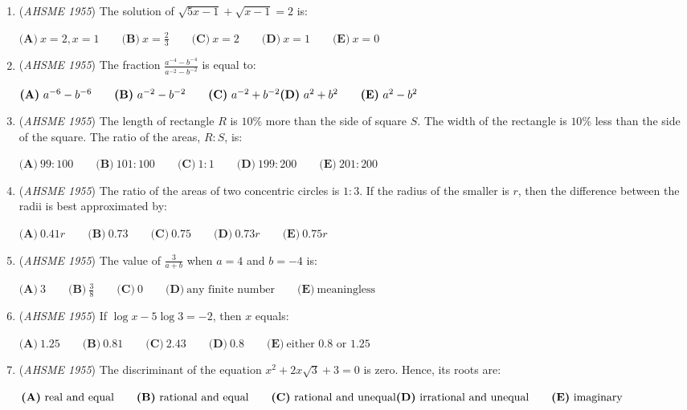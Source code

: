 \begin{enumerate}
	\item (\textit{AHSME 1955}) The solution of $\sqrt{5x-1}+\sqrt{x-1}=2$ is: 


 $\textbf{(A)}\ x=2,x=1\qquad\textbf{(B)}\ x=\frac{2}{3}\qquad\textbf{(C)}\ x=2\qquad\textbf{(D)}\ x=1\qquad\textbf{(E)}\ x=0$


	\item (\textit{AHSME 1955}) The fraction $\frac{a^{-4}-b^{-4}}{a^{-2}-b^{-2}}$ is equal to: 


 $\textbf{(A)}\ a^{-6}-b^{-6}\qquad\textbf{(B)}\ a^{-2}-b^{-2}\qquad\textbf{(C)}\ a^{-2}+b^{-2}\\ \textbf{(D)}\ a^2+b^2\qquad\textbf{(E)}\ a^2-b^2$


	\item (\textit{AHSME 1955}) The length of rectangle $R$ is $10$\% more than the side of square $S$. The width of the rectangle is $10$\% less than the side of the square. 
The ratio of the areas, $R:S$, is: 


 $\textbf{(A)}\ 99: 100\qquad\textbf{(B)}\ 101: 100\qquad\textbf{(C)}\ 1: 1\qquad\textbf{(D)}\ 199: 200\qquad\textbf{(E)}\ 201: 200$


	\item (\textit{AHSME 1955}) The ratio of the areas of two concentric circles is $1: 3$. If the radius of the smaller is $r$, then the difference between the 
radii is best approximated by: 


 $\textbf{(A)}\ 0.41r \qquad \textbf{(B)}\ 0.73 \qquad \textbf{(C)}\ 0.75 \qquad \textbf{(D)}\ 0.73r \qquad \textbf{(E)}\ 0.75r$


	\item (\textit{AHSME 1955}) The value of $\frac{3}{a+b}$ when $a=4$ and $b=-4$ is: 


 $\textbf{(A)}\ 3\qquad\textbf{(B)}\ \frac{3}{8}\qquad\textbf{(C)}\ 0\qquad\textbf{(D)}\ \text{any finite number}\qquad\textbf{(E)}\ \text{meaningless}$


	\item (\textit{AHSME 1955}) If $\log x-5 \log 3=-2$, then $x$ equals: 


 $\textbf{(A)}\ 1.25\qquad\textbf{(B)}\ 0.81\qquad\textbf{(C)}\ 2.43\qquad\textbf{(D)}\ 0.8\qquad\textbf{(E)}\ \text{either 0.8 or 1.25}$


	\item (\textit{AHSME 1955}) The discriminant of the equation $x^2+2x\sqrt{3}+3=0$ is zero. Hence, its roots are: 


 $\textbf{(A)}\ \text{real and equal}\qquad\textbf{(B)}\ \text{rational and equal}\qquad\textbf{(C)}\ \text{rational and unequal}\\ \textbf{(D)}\ \text{irrational and unequal}\qquad\textbf{(E)}\ \text{imaginary}$



\end{enumerate}
